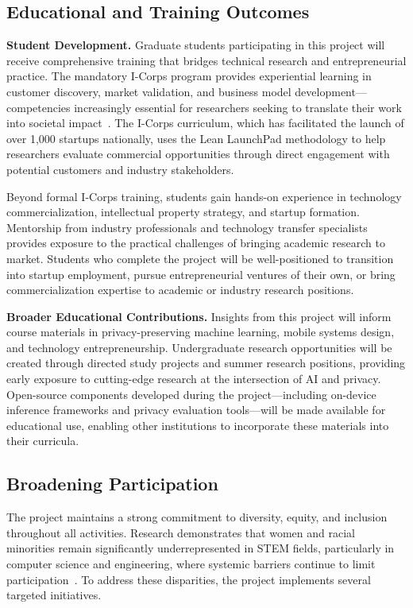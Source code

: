 \documentclass[11pt]{article}
\begin{document}
\vspace*{-8pt}
\subsection{Educational and Training Outcomes}
\vspace*{-8pt}
\textbf{Student Development.}
Graduate students participating in this project will receive comprehensive 
training that bridges technical research and entrepreneurial practice. The 
mandatory I-Corps program provides experiential learning in customer discovery, 
market validation, and business model development---competencies increasingly 
essential for researchers seeking to translate their work into societal 
impact~\cite{duval2020training}. The I-Corps curriculum, which has facilitated 
the launch of over 1,000 startups nationally, uses the Lean LaunchPad methodology 
to help researchers evaluate commercial opportunities through direct engagement 
with potential customers and industry stakeholders.

Beyond formal I-Corps training, students gain hands-on experience in technology 
commercialization, intellectual property strategy, and startup formation. 
Mentorship from industry professionals and technology transfer specialists 
provides exposure to the practical challenges of bringing academic research to 
market. Students who complete the project will be well-positioned to transition 
into startup employment, pursue entrepreneurial ventures of their own, or bring 
commercialization expertise to academic or industry research positions.

\textbf{Broader Educational Contributions.}
Insights from this project will inform course materials in privacy-preserving 
machine learning, mobile systems design, and technology entrepreneurship. 
Undergraduate research opportunities will be created through directed study 
projects and summer research positions, providing early exposure to cutting-edge 
research at the intersection of AI and privacy. Open-source components developed 
during the project---including on-device inference frameworks and privacy 
evaluation tools---will be made available for educational use, enabling other 
institutions to incorporate these materials into their curricula.

\vspace*{-8pt}
\subsection{Broadening Participation}
\vspace*{-8pt}
The project maintains a strong commitment to diversity, equity, and inclusion 
throughout all activities. Research demonstrates that women and racial minorities 
remain significantly underrepresented in STEM fields, particularly in computer 
science and engineering, where systemic barriers continue to limit 
participation~\cite{rincon2023inclusion}. To address these disparities, the 
project implements several targeted initiatives.
\end{document}
